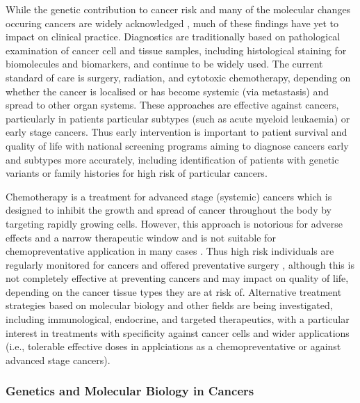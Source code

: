 While the genetic contribution to cancer risk and many of the molecular changes occuring cancers are widely acknowledged \citep{CancerResearchUK2017, ASCO2017, CSNZ2017}, much of these findings have yet to impact on clinical practice. Diagnostics are traditionally based on pathological examination of cancer cell and tissue samples, including histological staining for biomolecules and biomarkers, and continue to be widely used. The current standard of care is surgery, radiation, and cytotoxic chemotherapy, depending on whether the cancer is localised or has become systemic (via metastasis) and spread to other organ systems. These approaches are effective against cancers, particularly in patients particular subtypes (such as acute myeloid leukaemia) or early stage cancers. Thus early intervention is important to patient survival and quality of life with national screening programs aiming to diagnose cancers early and subtypes more accurately, including identification of patients with genetic variants or family histories for high risk of particular cancers.

Chemotherapy is a treatment for advanced stage (systemic) cancers which is designed to inhibit the growth and spread of cancer throughout the body by targeting rapidly growing cells. However, this approach is notorious for adverse effects and a narrow therapeutic window and is not suitable for chemopreventative application in many cases \citep{Kaelin2009}. Thus high risk individuals are regularly monitored for cancers and offered preventative surgery \citep{Guilford2010, Scheuer2002}, although this is not completely effective at preventing cancers and may impact on quality of life, depending on the cancer tissue types they are at risk of. Alternative treatment strategies based on molecular biology and other fields are being investigated, including immunological, endocrine, and targeted therapeutics, with a particular interest in treatments with specificity against cancer cells and wider applications (i.e., tolerable effective doses in applciations as a chemopreventative or against advanced stage cancers).

\subsubsection{Genetics and Molecular Biology in Cancers}

